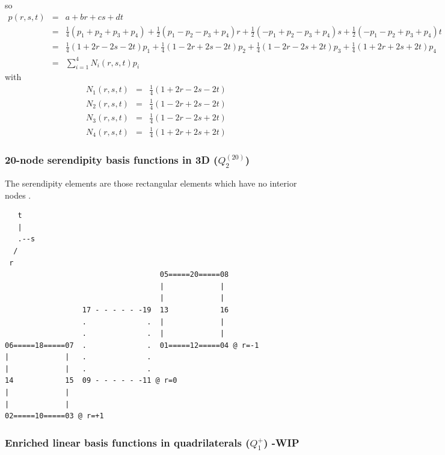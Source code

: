 so 
\begin{eqnarray}
p(r,s,t)
&=& a+br+cs+dt \nonumber\\
&=& \frac{1}{4}(p_1+p_2+p_3+p_4)
+\frac{1}{2}(p_1-p_2-p_3+p_4)r
+\frac{1}{2}(-p_1+p_2-p_3+p_4)s
+\frac{1}{2}(-p_1-p_2+p_3+p_4)t\nonumber\\
&=&
\frac{1}{4}(1+2r-2s-2t)p_1+
\frac{1}{4}(1-2r+2s-2t)p_2+
\frac{1}{4}(1-2r-2s+2t)p_3+
\frac{1}{4}(1+2r+2s+2t)p_4 \nonumber\\
&=& \sum_{i=1}^4 N_i(r,s,t) p_i
\end{eqnarray}
with
\begin{eqnarray}
N_1(r,s,t) &=& \frac{1}{4}(1+2r-2s-2t)\nonumber\\
N_2(r,s,t) &=& \frac{1}{4}(1-2r+2s-2t)\nonumber\\
N_3(r,s,t) &=& \frac{1}{4}(1-2r-2s+2t)\nonumber\\
N_4(r,s,t) &=& \frac{1}{4}(1+2r+2s+2t)\nonumber
\end{eqnarray}

\subsubsection{20-node serendipity basis functions in 3D ($Q_2^{(20)}$)}
 

The serendipity elements are those rectangular elements which have no
interior nodes \cite[p91]{reddybook2}.

\begin{verbatim}
   t
   |
   .--s
  /
 r
                                    05=====20=====08 
                                    |             |  
                                    |             |  
                  17 - - - - - -19  13            16
                  .              .  |             |  
                  .              .  |             |  
06=====18=====07  .              .  01=====12=====04 @ r=-1
|             |   .              . 
|             |   .              .  
14            15  09 - - - - - -11 @ r=0
|             |   
|             |  
02=====10=====03 @ r=+1
\end{verbatim}



\subsubsection{Enriched linear basis functions in quadrilaterals ($Q_1^+$) -WIP} \label{ss:quadmini3D}

